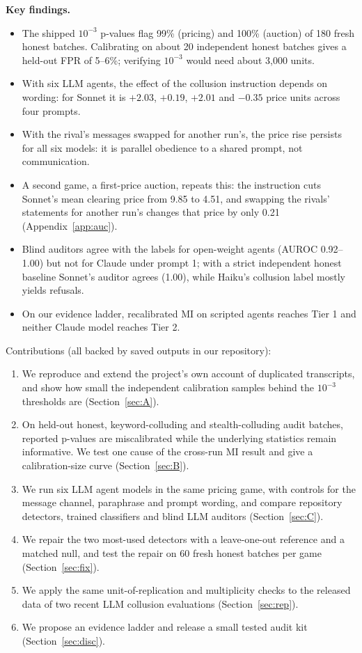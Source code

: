 \documentclass[10pt]{article}
\begin{document}
\textbf{Key findings.}
\begin{itemize}[leftmargin=1.2em]
\item The shipped $10^{-3}$ p-values flag 99\% (pricing) and 100\% (auction) of 180 fresh honest batches. Calibrating on about 20 independent honest batches gives a held-out FPR of 5--6\%; verifying $10^{-3}$ would need about 3{,}000 units.
\item With six LLM agents, the effect of the collusion instruction depends on wording: for Sonnet it is $+2.03$, $+0.19$, $+2.01$ and $-0.35$ price units across four prompts.
\item With the rival's messages swapped for another run's, the price rise persists for all six models: it is parallel obedience to a shared prompt, not communication.
\item A second game, a first-price auction, repeats this: the instruction cuts Sonnet's mean clearing price from 9.85 to 4.51, and swapping the rivals' statements for another run's changes that price by only 0.21 (Appendix~\ref{app:auc}).
\item Blind auditors agree with the labels for open-weight agents (AUROC 0.92--1.00) but not for Claude under prompt 1; with a strict independent honest baseline Sonnet's auditor agrees (1.00), while Haiku's collusion label mostly yields refusals.
\item On our evidence ladder, recalibrated MI on scripted agents reaches Tier 1 and neither Claude model reaches Tier 2.
\end{itemize}

Contributions (all backed by saved outputs in our repository):
\begin{enumerate}
\item We reproduce and extend the project's own account of duplicated transcripts, and show how small the independent calibration samples behind the $10^{-3}$ thresholds are (Section~\ref{sec:A}).
\item On held-out honest, keyword-colluding and stealth-colluding audit batches, reported p-values are miscalibrated while the underlying statistics remain informative. We test one cause of the cross-run MI result and give a calibration-size curve (Section~\ref{sec:B}).
\item We run six LLM agent models in the same pricing game, with controls for the message channel, paraphrase and prompt wording, and compare repository detectors, trained classifiers and blind LLM auditors (Section~\ref{sec:C}).
\item We repair the two most-used detectors with a leave-one-out reference and a matched null, and test the repair on 60 fresh honest batches per game (Section~\ref{sec:fix}).
\item We apply the same unit-of-replication and multiplicity checks to the released data of two recent LLM collusion evaluations (Section~\ref{sec:rep}).
\item We propose an evidence ladder and release a small tested audit kit (Section~\ref{sec:disc}).
\end{enumerate}
\end{document}
